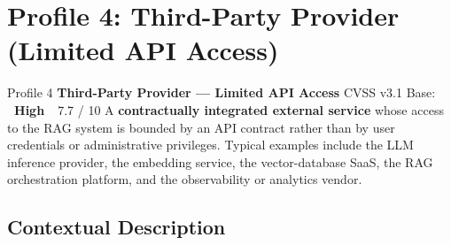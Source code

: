 \documentclass[a4paper,12pt]{report}
\newcommand{\badgehigh}{%
  \colorbox{warn}{\color{white}\small\textbf{~High~}}}
\begin{document}
\newpage
\section{Profile 4: Third-Party Provider (Limited API Access)}

\begin{profilebanner}%
  {Profile 4 \enspace\textbf{Third-Party Provider --- Limited API Access}}%
  {CVSS v3.1 Base: \badgehigh\ 7.7 / 10}
  \small
  A \textbf{contractually integrated external service} whose access to the
  RAG system is bounded by an API contract rather than by user credentials
  or administrative privileges. Typical examples include the LLM inference
  provider, the embedding service, the vector-database SaaS, the RAG
  orchestration platform, and the observability or analytics vendor.
\end{profilebanner}

\subsection{Contextual Description}
\end{document}
